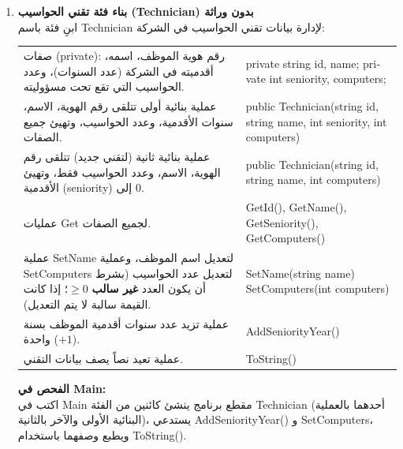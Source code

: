 \documentclass[14pt]{extarticle}
\begin{document}
\begin{enumerate}[label=\textbf{تمرين \arabic*:}, wide=0pt, itemsep=2.2em]

    \item \textbf{بناء فئة تقني الحواسيب (\textenglish{Technician}) بدون وراثة} \\
    ابنِ فئة باسم \textenglish{Technician} لإدارة بيانات تقني الحواسيب في الشركة:

    {\renewcommand{\arraystretch}{1.2}
    \small
    \begin{longtable}{|>{\raggedleft\arraybackslash}p{}|>{\raggedright\arraybackslash}p{}|}
    \hline
    \multicolumn{2}{|c|}{\textbf{الفئة: \textenglish{Technician}}} \\
    \hline
    صفات (\textenglish{private}): رقم هوية الموظف، اسمه، أقدميته في الشركة (عدد السنوات)، وعدد الحواسيب التي تقع تحت مسؤوليته. & \textenglish{private string id, name;} \newline \textenglish{private int seniority, computers;} \\
    \hline
    عملية بنائية أولى تتلقى رقم الهوية، الاسم، سنوات الأقدمية، وعدد الحواسيب، وتهيئ جميع الصفات. & \textenglish{public Technician(string id, string name, int seniority, int computers)} \\
    \hline
    عملية بنائية ثانية (لتقني جديد) تتلقى رقم الهوية، الاسم، وعدد الحواسيب فقط، وتهيئ الأقدمية (\textenglish{seniority}) إلى $0$. & \textenglish{public Technician(string id, string name, int computers)} \\
    \hline
    عمليات \textenglish{Get} لجميع الصفات. & \textenglish{GetId(), GetName(), GetSeniority(), GetComputers()} \\
    \hline
    عملية \textenglish{SetName} لتعديل اسم الموظف، وعملية \textenglish{SetComputers} لتعديل عدد الحواسيب (بشرط أن يكون العدد \textbf{غير سالب} $\ge 0$؛ إذا كانت القيمة سالبة لا يتم التعديل). & \textenglish{SetName(string name)} \newline \textenglish{SetComputers(int computers)} \\
    \hline
    عملية تزيد عدد سنوات أقدمية الموظف بسنة واحدة ($+1$). & \textenglish{AddSeniorityYear()} \\
    \hline
    عملية تعيد نصاً يصف بيانات التقني. & \textenglish{ToString()} \\
    \hline
    \end{longtable}}

    \vspace{1em}
    \noindent \textbf{الفحص في \textenglish{Main}:} \\
    اكتب في \textenglish{Main} مقطع برنامج ينشئ كائنين من الفئة \textenglish{Technician} (أحدهما بالعملية البنائية الأولى والآخر بالثانية)، يستدعي \textenglish{AddSeniorityYear()} و \textenglish{SetComputers}، ويطبع وصفهما باستخدام \textenglish{ToString()}.
    \filbreak


\end{enumerate}
\end{document}
